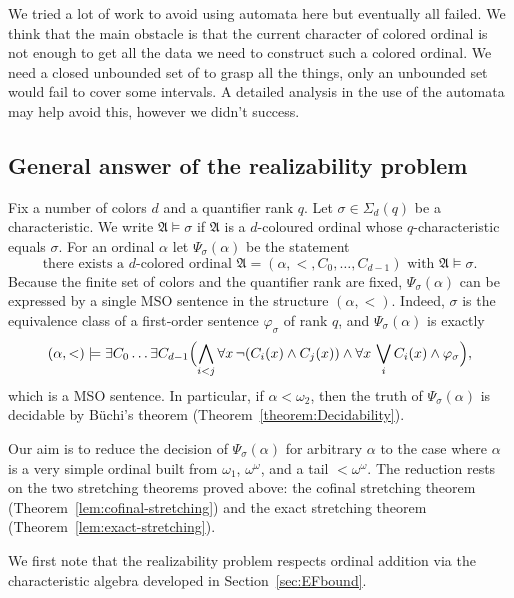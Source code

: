 \documentclass{amsart}
\theoremstyle{definition}
\begin{document}
We tried a lot of work to avoid using automata here but eventually all failed. We think that the main obstacle is that the current character of colored ordinal is not enough to get all the data we need to construct such a colored ordinal. We need a closed unbounded set of to grasp all the things, only an unbounded set would fail to cover some intervals. A detailed analysis in the use of the automata may help avoid this, however we didn't success.

\subsection{General answer of the realizability problem}

Fix a number of colors $d$ and a quantifier rank $q$. Let $\sigma\in\Sigma_d(q)$ be a characteristic. We write $\mathfrak{A}\models\sigma$ if $\mathfrak{A}$ is a $d$-coloured ordinal whose $q$-characteristic equals $\sigma$. For an ordinal $\alpha$ let $\Psi_\sigma(\alpha)$ be the statement
\begin{equation*}\label{eq:Psi}
    \text{there exists a $d$-colored ordinal } \mathfrak{A}=(\alpha,<,C_0,\dots,C_{d-1})\text{ with } \mathfrak{A}\models\sigma .
\end{equation*}
Because the finite set of colors and the quantifier rank are fixed, $\Psi_\sigma(\alpha)$ can be expressed by a single MSO sentence in the structure $(\alpha,<)$. Indeed, $\sigma$ is the equivalence class of a first‑order sentence $\varphi_\sigma$ of rank $q$, and $\Psi_\sigma(\alpha)$ is exactly
$$(\alpha,<)\models \exists C_0\dots\exists C_{d-1}\Bigl(\bigwedge_{i<j}\forall x\,\neg(C_i(x)\wedge C_j(x))\wedge\forall x\,\bigvee_i C_i(x)\wedge \varphi_\sigma\Bigr),$$
which is a MSO sentence. In particular, if $\alpha<\omega_2$, then the truth of $\Psi_\sigma(\alpha)$ is decidable by B\"uchi's theorem (Theorem~\ref{theorem:Decidability}).

Our aim is to reduce the decision of $\Psi_\sigma(\alpha)$ for arbitrary $\alpha$ to the case where $\alpha$ is a very simple ordinal built from $\omega_1$, $\omega^\omega$, and a tail $<\omega^\omega$.  The reduction rests on the two stretching theorems proved above: the cofinal stretching theorem (Theorem~\ref{lem:cofinal-stretching}) and the exact stretching theorem (Theorem~\ref{lem:exact-stretching}).

We first note that the realizability problem respects ordinal addition via the characteristic algebra developed in Section~\ref{sec:EFbound}.
\end{document}

